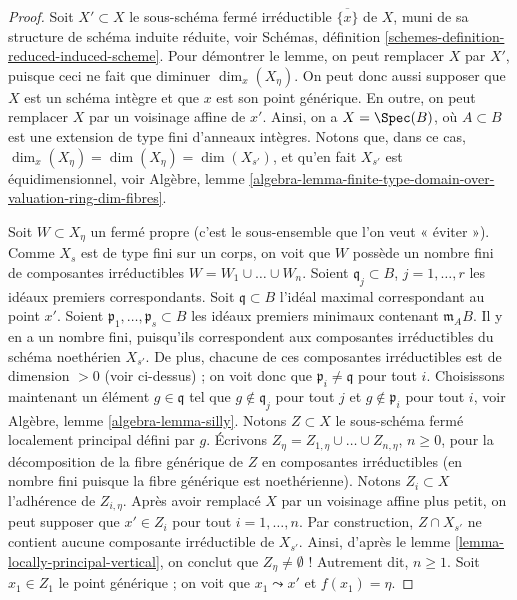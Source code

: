 \begin{proof}
\medskip\noindent
Soit $X' \subset X$ le sous-schéma fermé irréductible
$\overline{\{x\}}$ de $X$, muni de sa structure de schéma induite réduite, voir
Schémas, définition \ref{schemes-definition-reduced-induced-scheme}.
Pour démontrer le lemme, on peut remplacer $X$ par $X'$, puisque ceci ne fait que diminuer
$\dim_x(X_\eta)$. On peut donc aussi supposer que $X$ est un schéma intègre
et que $x$ est son point générique. En outre, on peut remplacer $X$ par un
voisinage affine de $x'$. Ainsi, on a $X = \Spec(B)$, où
$A \subset B$ est une extension de type fini d'anneaux intègres. Notons que, dans
ce cas, $\dim_x(X_\eta) = \dim(X_\eta) = \dim(X_{s'})$, et qu'en fait
$X_{s'}$ est équidimensionnel, voir
Algèbre,
lemme \ref{algebra-lemma-finite-type-domain-over-valuation-ring-dim-fibres}.

\medskip\noindent
Soit $W \subset X_\eta$ un fermé propre (c'est le
sous-ensemble que l'on veut « éviter »). Comme $X_s$ est de type fini sur un corps,
on voit que $W$ possède un nombre fini de composantes irréductibles
$W = W_1 \cup \ldots \cup W_n$. Soient
$\mathfrak q_j \subset B$, $j = 1, \ldots, r$
les idéaux premiers correspondants. Soit $\mathfrak q \subset B$
l'idéal maximal correspondant au point $x'$.
Soient $\mathfrak p_1, \ldots, \mathfrak p_s \subset B$ les
idéaux premiers minimaux contenant $\mathfrak m_AB$. Il y en a un nombre fini,
puisqu'ils correspondent aux composantes irréductibles du
schéma noethérien $X_{s'}$. De plus, chacune de ces composantes irréductibles
est de dimension $> 0$ (voir ci-dessus) ; on voit donc que
$\mathfrak p_i \not = \mathfrak q$ pour tout $i$.
Choisissons maintenant un élément $g \in \mathfrak q$ tel que
$g \not \in \mathfrak q_j$ pour tout $j$ et $g \not \in \mathfrak p_i$
pour tout $i$, voir
Algèbre, lemme \ref{algebra-lemma-silly}.
Notons $Z \subset X$ le sous-schéma fermé localement principal défini par $g$.
Écrivons $Z_\eta = Z_{1, \eta} \cup \ldots \cup Z_{n, \eta}$, $n \geq 0$,
pour la décomposition de la fibre générique de $Z$ en composantes irréductibles
(en nombre fini puisque la fibre générique est noethérienne).
Notons $Z_i \subset X$ l'adhérence de $Z_{i, \eta}$.
Après avoir remplacé $X$ par un voisinage affine plus petit,
on peut supposer que $x' \in Z_i$ pour tout $i = 1, \ldots, n$.
Par construction, $Z \cap X_{s'}$ ne contient aucune composante irréductible
de $X_{s'}$. Ainsi, d'après
le lemme \ref{lemma-locally-principal-vertical},
on conclut que $Z_\eta \not = \emptyset$ ! Autrement dit,
$n \geq 1$. Soit $x_1 \in Z_1$ le point générique ; on voit
que $x_1 \leadsto x'$ et $f(x_1) = \eta$.

\end{proof}
